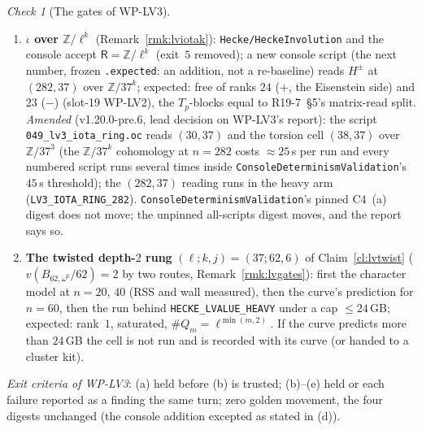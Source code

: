 \documentclass[11pt]{article}
\theoremstyle{remark}
\newtheorem{checkitem}[theorem]{Check}
\newcommand{\Z}{\mathbb{Z}}
\begin{document}
\begin{checkitem}[The gates of WP-LV3]
\begin{enumerate}
\item[(d)] \textbf{$\iota$ over $\Z/\ell^{k}$} (Remark~\ref{rmk:lviotak}): \texttt{Hecke/HeckeInvolution} and the console accept $\mathsf R=\Z/\ell^{k}$ (exit~$5$ removed); a new console script
  (the next number, frozen \texttt{.expected}: an addition, not a re-baseline) reads $H^{\pm}$ at $(282,37)$ over $\Z/37^{k}$; expected: free of ranks $24$ ($+$, the Eisenstein side) and
  $23$ ($-$) (slot-19 WP-LV2), the $T_p$-blocks equal to R19-7~\S5's matrix-read split. \emph{Amended} (v1.20.0-pre.6, lead decision on WP-LV3's report): the script
  \texttt{049\_lv3\_iota\_ring.oc} reads $(30,37)$ and the torsion cell $(38,37)$ over $\Z/37^{3}$ (the $\Z/37^{k}$ cohomology at $n=282$ costs $\approx25$\,s per run and every numbered script runs
  several times inside \texttt{ConsoleDeterminismValidation}'s $45$\,s threshold); the $(282,37)$ reading runs in the heavy arm (\texttt{LV3\_IOTA\_RING\_282}). \texttt{ConsoleDeterminismValidation}'s pinned C4~(a) digest does not move; the unpinned
  all-scripts digest moves, and the report says so.
\item[(e)] \textbf{The twisted depth-$2$ rung} $(\ell;k,j)=(37;62,6)$ of Claim~\ref{cl:lvtwist} ($v(B_{62,\omega^{6}}/62)=2$ by two routes, Remark~\ref{rmk:lvgates}): first the character model
  at $n=20$, $40$ (RSS and wall measured), then the curve's prediction for $n=60$, then the run behind \texttt{HECKE\_LVALUE\_HEAVY} under a cap $\le24$\,GB; expected: rank~$1$,
  saturated, $\#Q_m=\ell^{\min(m,2)}$. If the curve predicts more than $24$\,GB the cell is not run and is recorded with its curve (or handed to a cluster kit).
\end{enumerate}
\emph{Exit criteria of WP-LV3}: (a) held before (b) is trusted; (b)--(e) held or each failure reported as a finding the same turn; zero golden movement, the four digests unchanged
(the console addition excepted as stated in (d)).


\end{checkitem}
\end{document}
